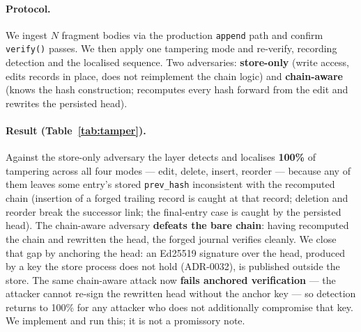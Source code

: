 \paragraph{Protocol.} We ingest $N$ fragment bodies via the
production \texttt{append} path and confirm \texttt{verify()}
passes. We then apply one tampering mode and re-verify, recording
detection and the localised sequence. Two adversaries:
\textbf{store-only} (write access, edits records in place, does
not reimplement the chain logic) and \textbf{chain-aware} (knows
the hash construction; recomputes every hash forward from the
edit and rewrites the persisted head).

\paragraph{Result (Table~\ref{tab:tamper}).} Against the
store-only adversary the layer detects and localises
\textbf{100\%} of tampering across all four modes --- edit,
delete, insert, reorder --- because any of them leaves some
entry's stored \texttt{prev\_hash} inconsistent with the
recomputed chain (insertion of a forged trailing record is caught
at that record; deletion and reorder break the successor link;
the final-entry case is caught by the persisted head). The
chain-aware adversary \textbf{defeats the bare chain}: having
recomputed the chain and rewritten the head, the forged journal
verifies cleanly. We close that gap by anchoring the head: an
Ed25519 signature over the head, produced by a key the store
process does not hold (ADR-0032), is published outside the store.
The same chain-aware attack now \textbf{fails anchored
verification} --- the attacker cannot re-sign the rewritten head
without the anchor key --- so detection returns to 100\% for any
attacker who does not additionally compromise that key. We
implement and run this; it is not a promissory note.

